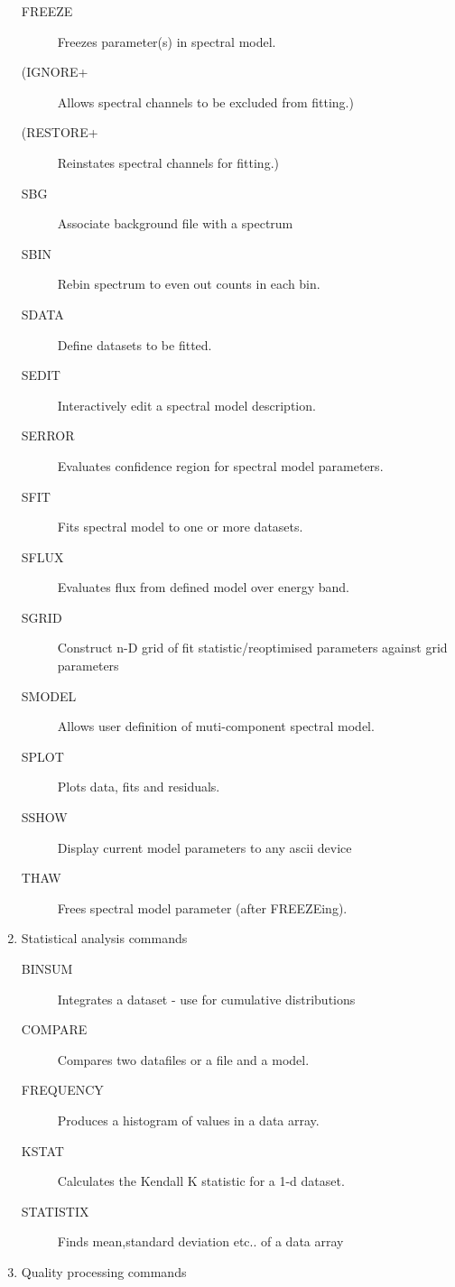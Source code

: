 \documentclass{book}
\renewcommand{\_}{{\tt\char'137}}     %
\begin{document}
\begin{enumerate}
\begin{description}
\item[FREEZE]
Freezes parameter(s) in spectral model.
\item[(IGNORE+]
Allows spectral channels to be excluded from fitting.)
\item[(RESTORE+]
Reinstates spectral channels for fitting.)
\item[SBG]
Associate background file with a spectrum
\item[SBIN]
Rebin spectrum to even out counts in each bin.
\item[SDATA]
Define datasets to be fitted.
\item[SEDIT]
Interactively edit a spectral model description.
\item[SERROR]
Evaluates confidence region for spectral model parameters.
\item[SFIT]
Fits spectral model to one or more datasets.
\item[SFLUX]
Evaluates flux from defined model over energy band.
\item[SGRID]
Construct n-D grid of fit statistic/reoptimised
parameters against grid parameters
\item[SMODEL]
Allows user definition of muti-component spectral model.
\item[SPLOT]
Plots data, fits and residuals.
\item[SSHOW]
Display current model parameters to any ascii device
\item[THAW]
Frees spectral model parameter (after FREEZEing).
\end{description}
\item Statistical analysis commands
 
\begin{description}
\item[BINSUM]
Integrates a dataset - use for cumulative distributions
\item[COMPARE]
Compares two datafiles or a file and a model.
\item[FREQUENCY]
Produces a histogram of values in a data array.
\item[KSTAT]
Calculates the Kendall K statistic for a 1-d dataset.
\item[STATISTIX]
Finds mean,standard deviation etc.. of a data array
\end{description}
\item Quality processing commands
 

\end{enumerate}
\end{document}
